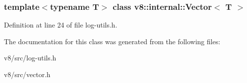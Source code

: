\subsubsection*{template$<$typename T$>$\newline
class v8\+::internal\+::\+Vector$<$ T $>$}



Definition at line 24 of file log-\/utils.\+h.



The documentation for this class was generated from the following files\+:\begin{DoxyCompactItemize}
\item 
v8/src/log-\/utils.\+h\item 
v8/src/vector.\+h\end{DoxyCompactItemize}
